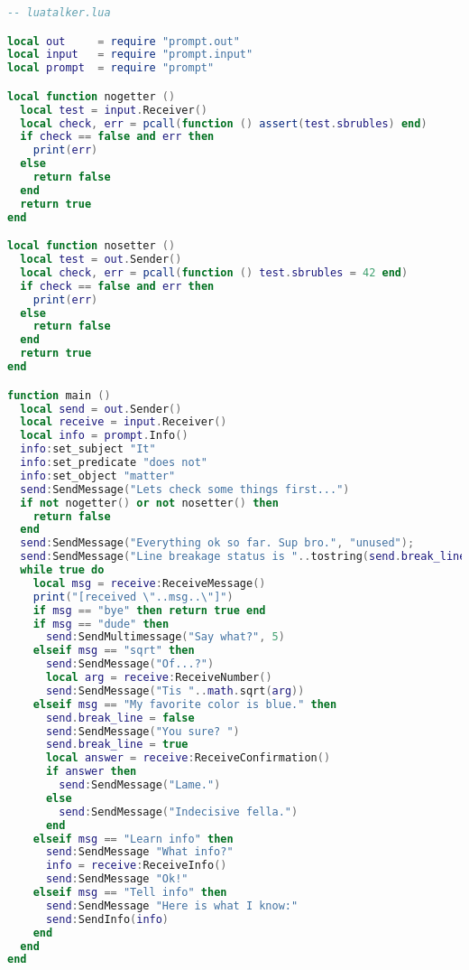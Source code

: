 \vspace{1em}

\begin{lstlisting}[language=lua]
-- luatalker.lua

local out     = require "prompt.out"
local input   = require "prompt.input"
local prompt  = require "prompt"

local function nogetter ()
  local test = input.Receiver()
  local check, err = pcall(function () assert(test.sbrubles) end)
  if check == false and err then
    print(err)
  else
    return false
  end
  return true
end

local function nosetter ()
  local test = out.Sender()
  local check, err = pcall(function () test.sbrubles = 42 end)
  if check == false and err then
    print(err)
  else
    return false
  end
  return true
end

function main ()
  local send = out.Sender()
  local receive = input.Receiver()
  local info = prompt.Info()
  info:set_subject "It"
  info:set_predicate "does not"
  info:set_object "matter"
  send:SendMessage("Lets check some things first...")
  if not nogetter() or not nosetter() then
    return false
  end
  send:SendMessage("Everything ok so far. Sup bro.", "unused");
  send:SendMessage("Line breakage status is "..tostring(send.break_line), "unused");
  while true do
    local msg = receive:ReceiveMessage()
    print("[received \"..msg..\"]")
    if msg == "bye" then return true end
    if msg == "dude" then
      send:SendMultimessage("Say what?", 5)
    elseif msg == "sqrt" then
      send:SendMessage("Of...?")
      local arg = receive:ReceiveNumber()
      send:SendMessage("Tis "..math.sqrt(arg))
    elseif msg == "My favorite color is blue." then
      send.break_line = false
      send:SendMessage("You sure? ")
      send.break_line = true
      local answer = receive:ReceiveConfirmation()
      if answer then
        send:SendMessage("Lame.")
      else
        send:SendMessage("Indecisive fella.")
      end
    elseif msg == "Learn info" then
      send:SendMessage "What info?"
      info = receive:ReceiveInfo()
      send:SendMessage "Ok!"
    elseif msg == "Tell info" then
      send:SendMessage "Here is what I know:"
      send:SendInfo(info)
    end
  end
end
\end{lstlisting}

\vspace{1em}

